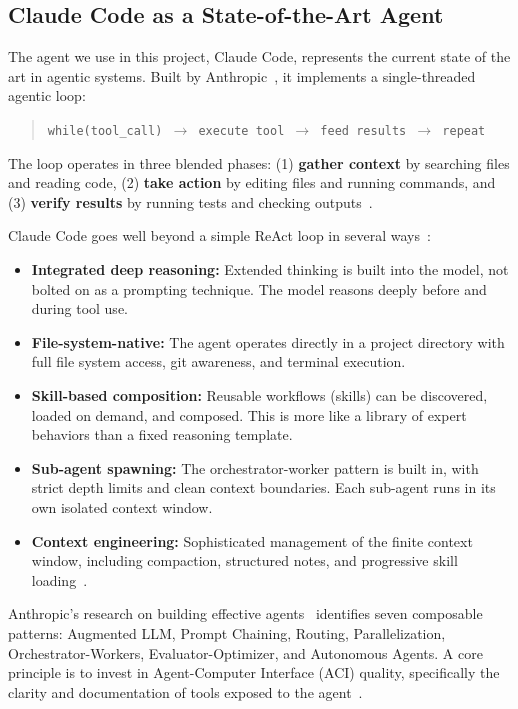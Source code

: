 \documentclass[12pt,a4paper]{report}
\begin{document}
\subsection{Claude Code as a State-of-the-Art Agent}

The agent we use in this project, Claude Code, represents the current state of the art in agentic systems. Built by Anthropic~\cite{anthropic2024agents}, it implements a single-threaded agentic loop:

\begin{quote}
\texttt{while(tool\_call) $\to$ execute tool $\to$ feed results $\to$ repeat}
\end{quote}

The loop operates in three blended phases: (1) \textbf{gather context} by searching files and reading code, (2) \textbf{take action} by editing files and running commands, and (3) \textbf{verify results} by running tests and checking outputs~\cite{anthropic2025howccworks}.

Claude Code goes well beyond a simple ReAct loop in several ways~\cite{anthropic2025contextengineering}:

\begin{itemize}[itemsep=0.3em]
    \item \textbf{Integrated deep reasoning:} Extended thinking is built into the model, not bolted on as a prompting technique. The model reasons deeply before and during tool use.
    \item \textbf{File-system-native:} The agent operates directly in a project directory with full file system access, git awareness, and terminal execution.
    \item \textbf{Skill-based composition:} Reusable workflows (skills) can be discovered, loaded on demand, and composed. This is more like a library of expert behaviors than a fixed reasoning template.
    \item \textbf{Sub-agent spawning:} The orchestrator-worker pattern is built in, with strict depth limits and clean context boundaries. Each sub-agent runs in its own isolated context window.
    \item \textbf{Context engineering:} Sophisticated management of the finite context window, including compaction, structured notes, and progressive skill loading~\cite{anthropic2025contextengineering}.
\end{itemize}

Anthropic's research on building effective agents~\cite{anthropic2024agents} identifies seven composable patterns: Augmented LLM, Prompt Chaining, Routing, Parallelization, Orchestrator-Workers, Evaluator-Optimizer, and Autonomous Agents. A core principle is to invest in Agent-Computer Interface (ACI) quality, specifically the clarity and documentation of tools exposed to the agent~\cite{anthropic2025writingtools}.
\end{document}
